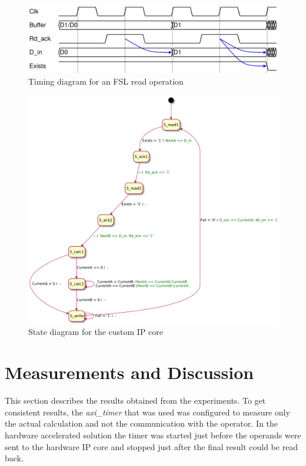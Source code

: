 \documentclass[11pt]{article}
\begin{document}
\begin{figure}
  \centering
  \includegraphics[width=1\textwidth]{timingdiagrams/read.pdf}
  \caption{Timing diagram for an FSL read operation}
  \label{fig:fsl-read}
\end{figure}

\begin{figure}
  \centering
  \includegraphics[width=1\textwidth]{statediagrams/hwstatediagram.pdf}
  \caption{State diagram for the custom IP core}
  \label{fig:state}
\end{figure}

\section{Measurements and Discussion\label{sec:measurements}}
This section describes the results obtained from the experiments. To get consistent results, the \emph{axi\_timer} that was used was configured to measure only the actual calculation and not the communication with the operator. In the hardware accelerated solution the timer was started just before the operands were sent to the hardware IP core and stopped just after the final result could be read back.
\end{document}
